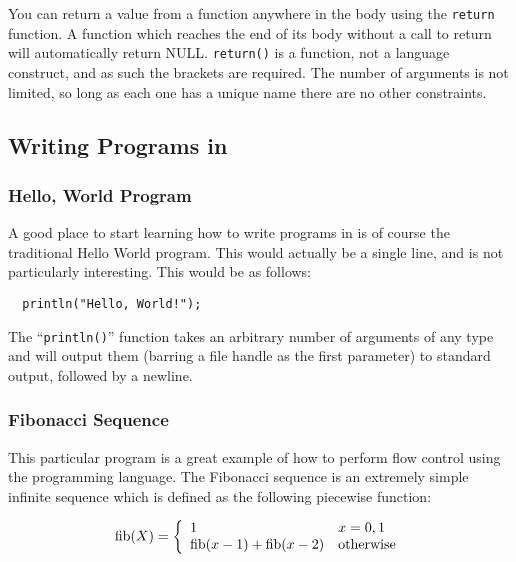 You can return a value from a function anywhere in the body using the {\tt return}
function. A function which reaches the end of its body without a call to return will
automatically return NULL. {\tt return()} is a function, not a language construct, 
and as such the brackets are required. The number of arguments is not limited, 
so long as each one has a unique name there are no other constraints.


\subsection{Writing Programs in \ModLang}

\subsubsection{Hello, World Program}

A good place to start learning how to write programs in \ModLang is of course
the traditional Hello World program. This would actually be a single line,
and is not particularly interesting. This would be as follows:

\lstset{language=LQX}
\begin{lstlisting}  
  println("Hello, World!"); 
\end{lstlisting}

The ``{\tt println()}'' function takes an arbitrary number of arguments of any
type and will output them (barring a file handle as the first parameter) to 
standard output, followed by a newline.

\subsubsection{Fibonacci Sequence}

This particular program is a great example of how to perform flow control
using the \ModLang programming language. The Fibonacci sequence is an extremely
simple infinite sequence which is defined as the following piecewise function:

\begin{equation}
  \mathrm{fib}(X) =  \left\{ \begin{array}{l l} 1 & x = 0, 1 \\ \mathrm{fib}(x-1) + 
      \mathrm{fib}(x-2) & \mathrm{otherwise} \end{array} \right.
\end{equation}

